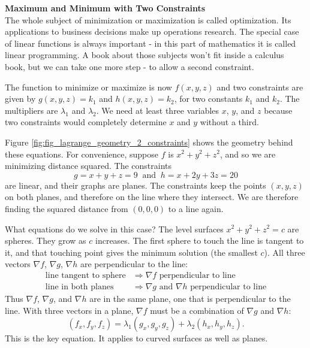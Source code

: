\medskip

\noindent\textbf{\large Maximum and Minimum with Two Constraints}\\

The whole subject of minimization or maximization is called optimization. Its applications to business decisions make up operations research. The special case of linear functions is always important - in this part of mathematics it is called linear programming. A book about those subjects won't fit inside a calculus book, but we can take one more step - to allow a second constraint.

The function to minimize or maximize is now $f(x,y,z)$ and two constraints are given by $g(x,y,z) = k_1$ and $h(x,y,z) = k_2$, for two constants $k_1$ and $k_2$.  The multipliers are $\lambda_1$ and $\lambda_2$.  We need at least three variables $x$, $y$, and $z$ because two constraints would completely determine $x$ and $y$ without a third.

Figure \ref{fig:fig_lagrange_geometry_2_constraints} shows the geometry behind these equations.  For convenience, suppose $f$ is $x^2 + y^2 + z^2$, and so we are minimizing distance squared.  The constraints $$g = x + y + z = 9 \: \text{ and } \: h = x + 2y + 3z = 20$$ are linear, and their graphs are planes.  The constraints keep the points $(x,y,z)$ on both planes, and therefore on the line where they intersect.  We are therefore finding the squared distance from $(0,0,0)$ to a line again.  


What equations do we solve in this case?  The level surfaces $x^2 + y^2 + z^2 = c$ are spheres.  They grow as $c$ increases.  The first sphere to touch the line is tangent to it, and that touching point gives the minimum solution (the smallest $c$). All three vectors $\nabla f$, $\nabla g$, $\nabla h$ are perpendicular to the line:
\begin{align*}
\text{line tangent to sphere} & \Rightarrow \nabla f \text{ perpendicular to line} \\
\text{line in both planes} & \Rightarrow \nabla g \text{ and } \nabla h \text{ perpendicular to line}
\end{align*}
Thus $\nabla f$, $\nabla g$, and $\nabla h$ are in the same plane, one that is perpendicular to the line.  With three vectors in a plane, $\nabla f$ must be a combination of $\nabla g$ and $\nabla h$:
$$(f_x,f_y,f_z) = \lambda_1 (g_x,g_y,g_z) + \lambda_2 (h_x,h_y,h_z).$$
This is the key equation.  It applies to curved surfaces as well as planes.

